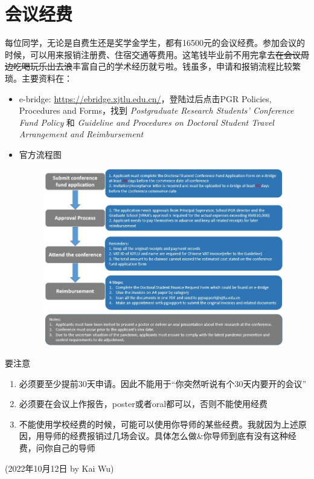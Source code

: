 \section{会议经费}
\label{section:fund}

每位同学，无论是自费生还是奖学金学生，都有16500元的会议经费。参加会议的时候，可以用来报销注册费、住宿交通等费用。这笔钱毕业前不用完拿去\sout{在会议周边吃喝玩乐出去浪}丰富自己的学术经历就亏啦。钱虽多，申请和报销流程比较繁琐。主要资料在：
\begin{itemize}
    \item e-bridge: \url{https://ebridge.xjtlu.edu.cn/}，登陆过后点击PGR Policies, Procedures and Forms，找到 \textit{Postgraduate Research Students' Conference Fund Policy} 和 \textit{
    Guideline and Procedures on Doctoral Student Travel Arrangement and Reimbursement}
    \item 官方流程图
    \begin{figure}[H]
        \centering
        \includegraphics[width=0.9\columnwidth]{author-folder/Kai.Wu/fund-flowchart.jpg}
    \end{figure}
\end{itemize}

要注意
\begin{enumerate}
    \item 必须要至少提前30天申请。因此不能用于“你突然听说有个30天内要开的会议”
    \item 必须要在会议上作报告，poster或者oral都可以，否则不能使用经费
    \item 不能使用学校经费的时候，可能可以使用你导师的某些经费。我就因为上述原因，用导师的经费报销过几场会议。具体怎么做\&你导师到底有没有这种经费，问你自己的导师
\end{enumerate}


\begin{flushright}
(2022年10月12日 by Kai Wu)
\end{flushright}